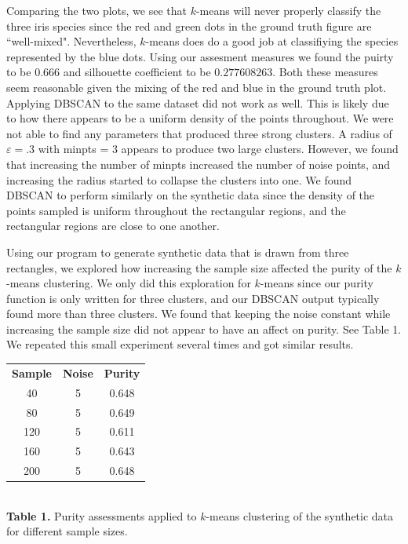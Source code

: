 \documentclass[psamsfonts,onesided,10pt]{amsart}
\begin{document}
Comparing the two plots, we see that $k$-means will never properly classify the three iris species 
since the red and green dots in the ground truth figure are ``well-mixed". Nevertheless, $k$-means 
does do a good job at classifiying the species represented by the blue dots. Using our assesment 
measures we found the puirty to be $0.666$ and silhouette coefficient to be $0.277608263$. 
Both these measures seem reasonable given the mixing of the red and blue in the ground truth plot.
Applying DBSCAN to the same dataset did not work as well. This is likely due to how there appears
 to be a uniform density of the points throughout. We were not able to find any parameters that 
produced three strong clusters. A radius of $\varepsilon = .3$  with minpts = 3 appears to 
produce two large clusters. However, we found that increasing the number of minpts increased 
the number of noise points, and increasing the radius started to collapse the clusters into one. 
We found DBSCAN to perform similarly on the synthetic data since the density of the 
points sampled is uniform throughout the rectangular regions, and the rectangular regions are 
close to one another.

Using our program to generate synthetic data that is drawn from three rectangles, we explored 
how increasing the sample size affected the purity of the $k$-means clustering. We only did this 
exploration for $k$-means since our purity function is only written for three clusters, and our 
DBSCAN output typically found more than three clusters. We found that 
keeping the noise constant while increasing the sample size did not appear to have an affect on 
purity. See Table 1. We repeated this small experiment several times and got similar results. 

\vspace{1ex}
\begin{center}
\begin{tabular}{ |c|c|c| } 
 \hline
\textbf{Sample} & \textbf{Noise} & \textbf{Purity}\\ 
40 & 5 & 0.648 \\ 
80 & 5 & 0.649 \\ 
120 & 5 & 0.611 \\ 
160 & 5 & 0.643 \\ 
200 & 5 & 0.648 \\ 
 \hline
\end{tabular}\\
\textbf{Table 1.} Purity assessments applied to $k$-means clustering of the synthetic data for 
different sample sizes.
\end{center}
\vspace{1ex}
\end{document}
